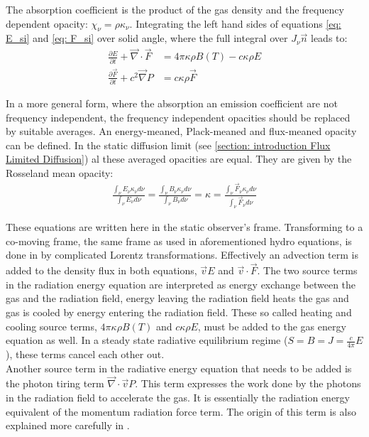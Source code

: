 The absorption coefficient is the product of the gas density and the frequency dependent opacity: $\chi_\nu = \rho \kappa_\nu$. Integrating the left hand sides of equations \ref{eq: E_si} and \ref{eq: F_si} over solid angle, where the full integral over $J_\nu \vec{n} $ leads to:
\begin{align}
\frac{\partial E}{\partial t} + \vec{\nabla} \cdot \vec{F} &= 4\pi \kappa\rho B(T) - c \kappa \rho E\\
\frac{\partial \vec{F}}{\partial t} + c^2 \vec{\nabla} P &=  c \kappa \rho \vec{F} 
\end{align}

In a more general form, where the absorption an emission coefficient are not frequency independent, the frequency independent opacities should be replaced by suitable averages. An energy-meaned, Plack-meaned and flux-meaned opacity can be defined. In the static diffusion limit (see \ref{section: introduction Flux Limited Diffusion}) al these averaged opacities are equal. They are given by the Rosseland mean opacity:
\begin{align}
\frac{\int_\nu E_\nu \kappa_\nu d\nu}{\int_\nu E_\nu d\nu} = \frac{\int_\nu B_\nu \kappa_\nu d\nu}{\int_\nu B_\nu d\nu} = \kappa = \frac{\int_\nu \vec{F}_\nu \kappa_\nu d\nu}{\int_\nu \vec{F}_\nu d\nu}
\end{align}

These equations are written here in the static observer's frame. Transforming to a co-moving frame, the same frame as used in aforementioned hydro equations, is done in \citep{Mihalas1984a} by complicated Lorentz transformations. Effectively an advection term is added to the density flux in  both equations, $\vec{v} E$ and $\vec{v} \cdot \vec{F}$. The two source terms in the radiation energy equation are interpreted as energy exchange between the gas and the radiation field, energy leaving the radiation field heats the gas and gas is cooled by energy entering the radiation field. These so called heating and cooling source terms, $4\pi \kappa\rho B(T)$ and $ c \kappa \rho E$, must be added to the gas energy equation as well. In a steady state radiative equilibrium regime ($S = B = J = \frac{c}{4\pi}E$), these terms cancel each other out.\\

Another source term in the radiative energy equation that needs to be added is the photon tiring term $\vec{\nabla} \cdot \vec{v} P $. This term expresses the work done by the photons in the radiation field to accelerate the gas. It is essentially the radiation energy equivalent of the momentum radiation force term. The origin of this term is also explained more carefully in \citep{Mihalas1984a}. \\

